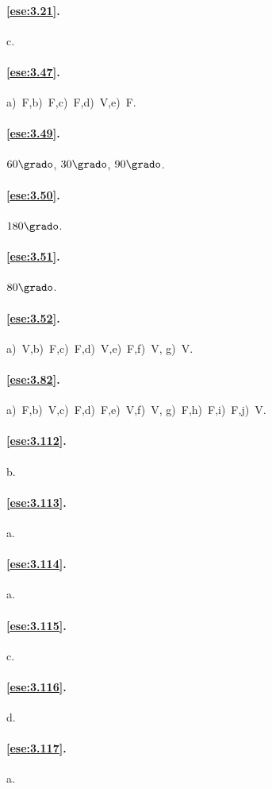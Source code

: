 \paragraph{\ref{ese:3.21}.}
c.

\paragraph{\ref{ese:3.47}.}
a)~F,\quad b)~F,\quad c)~F,\quad d)~V,\quad e)~F.

\paragraph{\ref{ese:3.49}.}
\(60\grado\), \(30\grado\), \(90\grado\).

\paragraph{\ref{ese:3.50}.}
\(180\grado\).

\paragraph{\ref{ese:3.51}.}
\(80\grado\).

\paragraph{\ref{ese:3.52}.}
a)~V,\quad b)~F,\quad c)~F,\quad d)~V,\quad e)~F,\quad f)~V,\quad 
g)~V.

\paragraph{\ref{ese:3.82}.}
a)~F,\quad b)~V,\quad c)~F,\quad d)~F,\quad e)~V,\quad f)~V,\quad 
g)~F,\quad h)~F,\quad i)~F,\quad j)~V.

\paragraph{\ref{ese:3.112}.}
b.

\paragraph{\ref{ese:3.113}.}
a.

\paragraph{\ref{ese:3.114}.}
a.

\paragraph{\ref{ese:3.115}.}
c.

\paragraph{\ref{ese:3.116}.}
d.

\paragraph{\ref{ese:3.117}.}
a.

\endgroup
